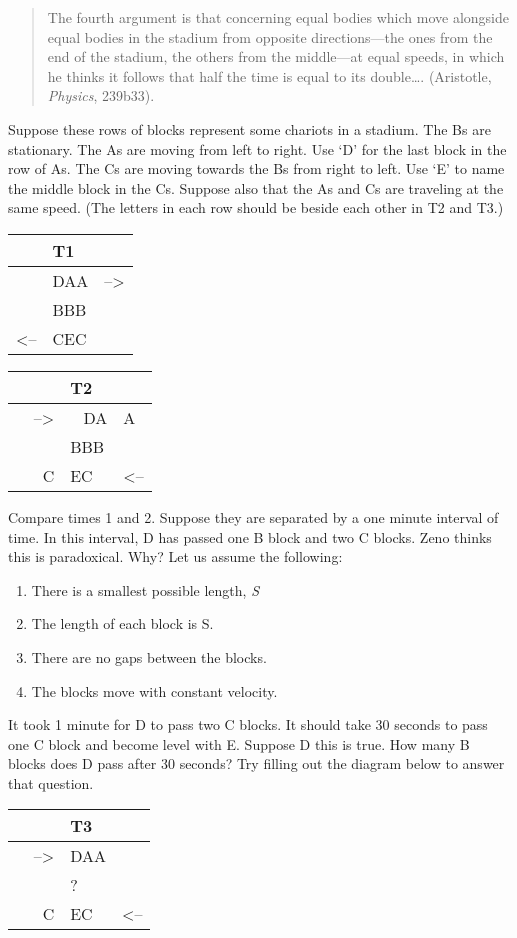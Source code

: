 \documentclass[oneside]{article}
\begin{document}
\begin{quote}
The fourth argument is that concerning equal bodies which move alongside equal bodies in the stadium from opposite directions---the ones from the end of the stadium, the others from the middle---at equal speeds, in which he thinks it follows that half the time is equal to its
double\ldots{}. (Aristotle, \emph{Physics}, 239b33).
\end{quote}
Suppose these rows of blocks represent some chariots in a stadium. The
Bs are stationary. The As are moving from left to right. Use `D' for the last block in the row of As. The Cs are moving towards the Bs from right to left. Use `E' to name the middle block in the Cs. Suppose also that the As and Cs are traveling at the same speed. (The letters in each row should be beside each other in T2 and T3.)

\begin{longtable}[c]{@{}lll@{}}
\toprule
& T1 &\tabularnewline
\midrule
\endhead
& DAA & --\textgreater{}\tabularnewline
& BBB &\tabularnewline
\textless{}-- & CEC &\tabularnewline
\end{longtable}

\begin{longtable}[c]{@{}rll@{}}
\toprule
& T2 &\tabularnewline
\midrule
\endhead
--\textgreater{} & ~ DA & A\tabularnewline
& BBB &\tabularnewline
~ ~ C & EC~ & \textless{}--\tabularnewline
\end{longtable}
\noindent Compare times 1 and 2. Suppose they are separated by a one minute
interval of time. In this interval, D has passed one B block and two C blocks. Zeno thinks this is paradoxical. Why? Let us assume the following:

\begin{enumerate}
\item
  There is a smallest possible length, \emph{S}
\item
  The length of each block is S.
\item
  There are no gaps between the blocks.
\item
  The blocks move with constant velocity.
\end{enumerate}
\noindent It took 1 minute for D to pass two C blocks. It should take 30 seconds to
pass one C block and become level with E. Suppose D this is true. How many B blocks does D pass after 30 seconds?  Try filling out the diagram below to answer that question.

\begin{longtable}[c]{@{}rll@{}}
\toprule
& T3 &\tabularnewline
\midrule
\endhead
--\textgreater{} & DAA &\tabularnewline
& ? &\tabularnewline
~ ~ C & EC~ & \textless{}--\tabularnewline
\end{longtable}
\end{document}
